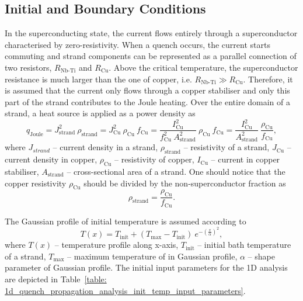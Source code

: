 \subsection{Initial and Boundary Conditions}

In the superconducting state, the current flows entirely through a superconductor characterised by zero-resistivity. When a quench occurs, the current starts commuting and strand components can be represented as a parallel connection of two resistors, $R_\text{Nb-Ti}$ and $R_\text{Cu}$. Above the critical temperature, the superconductor resistance is much larger than the one of copper, i.e. $R_\text{Nb-Ti} \gg R_\text{Cu}$. Therefore, it is assumed that the current only flows through a copper stabiliser and only this part of the strand contributes to the Joule heating. Over the entire domain of a strand, a heat source is applied as a power density as
\begin{equation}
    q_\text{Joule} = J_\text{strand}^2~\rho_\text{strand} = J_\text{Cu}^2~\rho_\text{Cu}~f_\text{Cu} = \frac{I_\text{Cu}^2}{f_\text{Cu}^2~A_\text{strand}^2}~\rho_\text{Cu}~f_\text{Cu} = \frac{I_\text{Cu}^2}{A_\text{strand}^2}~\frac{\rho_\text{Cu}}{f_\text{Cu}}, 
    \label{eqn: p_dens_equiv}
\end{equation}
where $J_{strand}$ -- current density in a strand, $\rho_\text{strand}$ -- resistivity of a strand, $J_\text{Cu}$ -- current density in copper, $\rho_\text{Cu}$ -- resistivity of copper, $I_\text{Cu}$ -- current in copper stabiliser, $A_\text{strand}$ -- cross-sectional area of a strand. One should notice that the copper resistivity $\rho_\text{Cu}$ should be divided by the non-superconductor fraction as 
\begin{equation}
    \rho_\text{strand} = \frac{\rho_\text{Cu}}{f_\text{Cu}}.
    \label{eqn:strand_resistivity}
\end{equation}

The Gaussian profile of initial temperature is assumed according to 
\begin{equation}
    T(x) = T_\text{init} + (T_\text{max} - T_\text{init}) ~ e^{-(\frac{x}{\alpha})^2},
    \label{eqn: gaussian_temp_ic}
\end{equation}
where $T(x)$ -- temperature profile along x-axis, $T_\text{init}$ -- initial bath temperature of a strand, $T_\text{max}$ -- maximum temperature of in Gaussian profile, $\alpha$ -- shape parameter of Gaussian profile. The initial input parameters for the 1D analysis are depicted in Table~\ref{table: 1d_quench_propagation_analysis_init_temp_input_parameters}. 

